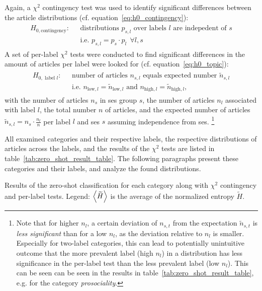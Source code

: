 Again, a $\chi^2$ contingency test was used to identify significant differences between the article distributions (cf. equation~\eqref{eq:h0_contingency}):
\begin{align}
    \begin{split}
        H_{0, \text{contingency}}: ~~~ &\text{distributions } p_{s, l} \text{ over labels } l \text{ are indepedent of } s\\
    & \text{i.e. } p_{s, l} = p_s \cdot p_l ~~ \forall l, s
    \end{split}
\end{align}
A set of per-label $\chi^2$ tests were conducted to find significant differences in the amount of articles per label were looked for (cf. equation~\eqref{eq:h0_topic}):
\begin{align}
    \begin{split}
        H_{0, \text{ label }l}: ~~~ &\text{number of articles } n_{s, l} \text{ equals expected number } \tilde n_{s, l} \\
        & \text{i.e. } n_{\text{low}, l} = \tilde n_{\text{low}, l} \text{ and } n_{\text{high}, l} = \tilde n_{\text{high}, l},
    \end{split}
\end{align}
with the number of articles $n_s$ in \gls{ses} group $s$, the number of articles $n_l$ associated with label $l$, the total number $n$ of articles, and the expected number of articles $\tilde n_{s, l} = n_s \cdot \frac{n_l}{n}$ per label $l$ and \gls{ses} $s$ assuming independence from \gls{ses}. \footnote{Note that for higher $n_l$, a certain deviation of $n_{s, t}$ from the expectation $\tilde n_{s, t}$ is \textit{less significant} than for a low $n_l$, as the deviation relative to $n_l$ is smaller. Especially for two-label categories, this can lead to potentially unintuitive outcome that the more prevalent label (high $n_l$) in a distribution has less significance in the per-label test than the less prevalent label (low $n_l$). This can be seen can be seen in the results in table~\ref{tab:zero_shot_result_table}, e.g. for the category \textit{prosociality}.}

All examined categories and their respective labels, the respective distributions of articles across the labels, and the results of the $\chi^2$ tests are listed in table~\ref{tab:zero_shot_result_table}. The following paragraphs present these categories and their labels, and analyze the found distributions.
\begin{table}
    \centering
    \resizebox{0.85\textwidth}{!}{}
    \caption{Results of the zero-shot classification for each category along with $\chi^2$ contingency and per-label tests. Legend: $\Braket{\widetilde{H}}$ is the average of the normalized entropy $\widetilde{H}$.}\label{tab:zero_shot_result_table}
\end{table}

